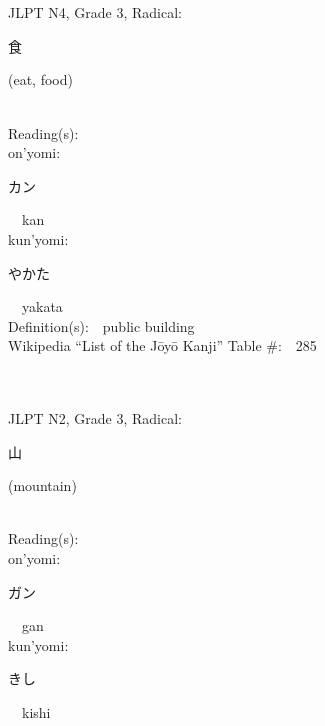 \begin{multicols}{2}
\ \ \\
{\fontsize{34pt}{40pt}  }\ \ \\  %
{JLPT N4, Grade 3, Radical:\ \ {\begin{CJK}{UTF8}{min} 食 \end{CJK}} (eat, food) } \\
Reading(s):\ \ \\
{\hspace*{1em}}on'yomi:\ \ \\
{\hspace*{2em}}{\begin{CJK}{UTF8}{min} カン \end{CJK}}\ \ kan\ \ \\
{\hspace*{1em}}kun'yomi:\ \ \\
{\hspace*{2em}}{\begin{CJK}{UTF8}{min} やかた \end{CJK}}\ \ yakata\ \ \\
Definition(s):\ \ public building \\
Wikipedia ``List of the J\=oy\=o Kanji'' Table \#:\ \ 285 \\
\ \ \\
{\fontsize{34pt}{40pt}  }\ \ \\  %
{JLPT N2, Grade 3, Radical:\ \ {\begin{CJK}{UTF8}{min} 山 \end{CJK}} (mountain) } \\
Reading(s):\ \ \\
{\hspace*{1em}}on'yomi:\ \ \\
{\hspace*{2em}}{\begin{CJK}{UTF8}{min} ガン \end{CJK}}\ \ gan\ \ \\
{\hspace*{1em}}kun'yomi:\ \ \\
{\hspace*{2em}}{\begin{CJK}{UTF8}{min} きし \end{CJK}}\ \ kishi\ \ \\

\end{multicols}
